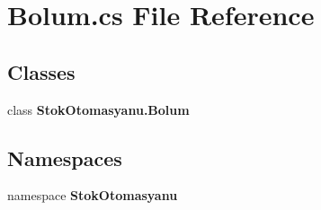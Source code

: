 \section{Bolum.\+cs File Reference}
\label{_bolum_8cs}
\subsection*{Classes}
\begin{DoxyCompactItemize}
\item 
class \textbf{ Stok\+Otomasyanu.\+Bolum}
\end{DoxyCompactItemize}
\subsection*{Namespaces}
\begin{DoxyCompactItemize}
\item 
namespace \textbf{ Stok\+Otomasyanu}
\end{DoxyCompactItemize}
